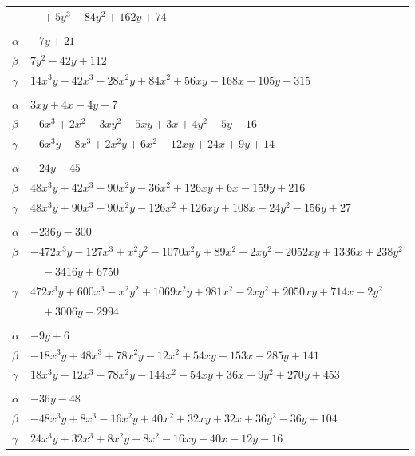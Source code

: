 \documentclass[11pt]{article}
\begin{document}
\begin{longtable}{@{}ll@{}}
 & $\quad +5y^{3}-84y^{2}+162y+74$\\
\addlinespace[3pt]
\multicolumn{2}{@{}l}{$\{i,j\}=\{68,81\}$, $k_{ij}=3\cdot 7^{3}$}\\
$\alpha$ & $-7y+21$\\
$\beta$ & $7y^{2}-42y+112$\\
$\gamma$ & $14x^{3}y-42x^{3}-28x^{2}y+84x^{2}+56xy-168x-105y+315$\\
\addlinespace[3pt]
\multicolumn{2}{@{}l}{$\{i,j\}=\{68,105\}$, $k_{ij}=3^{3}$}\\
$\alpha$ & $3xy+4x-4y-7$\\
$\beta$ & $-6x^{3}+2x^{2}-3xy^{2}+5xy+3x+4y^{2}-5y+16$\\
$\gamma$ & $-6x^{3}y-8x^{3}+2x^{2}y+6x^{2}+12xy+24x+9y+14$\\
\addlinespace[3pt]
\multicolumn{2}{@{}l}{$\{i,j\}=\{68,113\}$, $k_{ij}=3^{3}\cdot 19$}\\
$\alpha$ & $-24y-45$\\
$\beta$ & $48x^{3}y+42x^{3}-90x^{2}y-36x^{2}+126xy+6x-159y+216$\\
$\gamma$ & $48x^{3}y+90x^{3}-90x^{2}y-126x^{2}+126xy+108x-24y^{2}-156y+27$\\
\addlinespace[3pt]
\multicolumn{2}{@{}l}{$\{i,j\}=\{68,127\}$, $k_{ij}=2^{3}\cdot 3\cdot 7^{2}\cdot 19$}\\
$\alpha$ & $-236y-300$\\
$\beta$ & $-472x^{3}y-127x^{3}+x^{2}y^{2}-1070x^{2}y+89x^{2}+2xy^{2}-2052xy+1336x+238y^{2}$\\
 & $\quad -3416y+6750$\\
$\gamma$ & $472x^{3}y+600x^{3}-x^{2}y^{2}+1069x^{2}y+981x^{2}-2xy^{2}+2050xy+714x-2y^{2}$\\
 & $\quad +3006y-2994$\\
\addlinespace[3pt]
\multicolumn{2}{@{}l}{$\{i,j\}=\{68,139\}$, $k_{ij}=3^{2}\cdot 7^{2}$}\\
$\alpha$ & $-9y+6$\\
$\beta$ & $-18x^{3}y+48x^{3}+78x^{2}y-12x^{2}+54xy-153x-285y+141$\\
$\gamma$ & $18x^{3}y-12x^{3}-78x^{2}y-144x^{2}-54xy+36x+9y^{2}+270y+453$\\
\addlinespace[3pt]
\multicolumn{2}{@{}l}{$\{i,j\}=\{68,178\}$, $k_{ij}=2^{3}\cdot 3\cdot 7$}\\
$\alpha$ & $-36y-48$\\
$\beta$ & $-48x^{3}y+8x^{3}-16x^{2}y+40x^{2}+32xy+32x+36y^{2}-36y+104$\\
$\gamma$ & $24x^{3}y+32x^{3}+8x^{2}y-8x^{2}-16xy-40x-12y-16$\\

\end{longtable}
\end{document}
